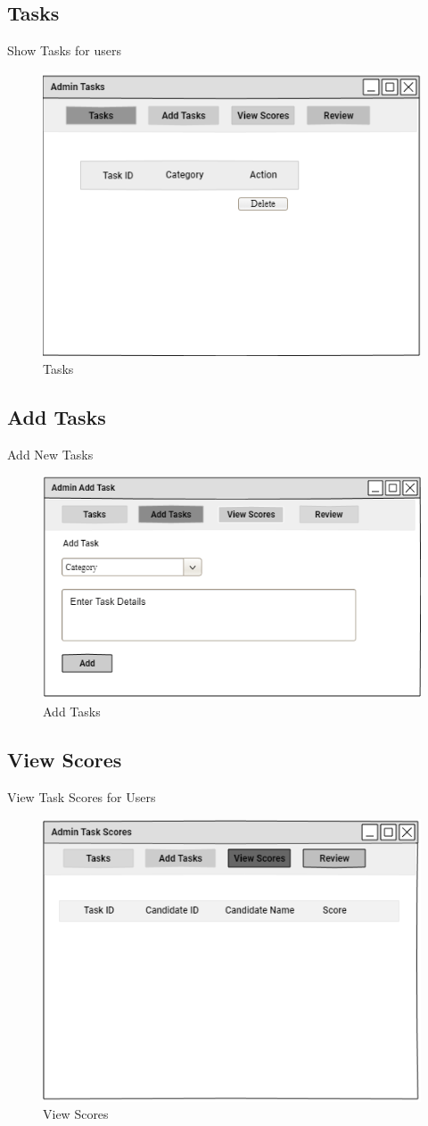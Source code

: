 \documentclass[a4paper,12pt]{report}
\begin{document}
\subsection {Tasks}
Show Tasks for users
\begin{figure}[bph]
	\centering
	\includegraphics[width=.55\linewidth]{img/admin/admintasks}
	\caption{Tasks}
\end{figure}
\pagebreak

\subsection {Add Tasks}
Add New Tasks
\begin{figure}[bph]
	\centering
	\includegraphics[width=.6\linewidth]{img/admin/adminaddtasks}
	\caption{Add Tasks}
\end{figure}

\subsection {View Scores}
View Task Scores for Users
\begin{figure}[bph]
	\centering
	\includegraphics[width=.6\linewidth]{img/admin/admintaskviewscores}
	\caption{View Scores}
\end{figure}
\pagebreak
\end{document}

